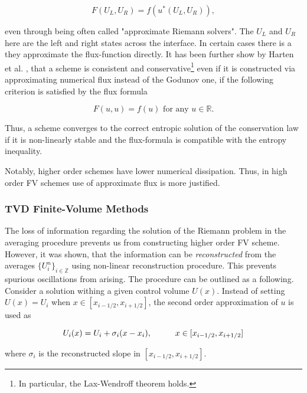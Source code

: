 \begin{equation}
F(U_L, U_R) = f(u^*(U_L, U_R)), 
\end{equation}

even through being often called "approximate Riemann solvers". The $U_L$ and $U_R$ here are the left and right states across the interface. In certain cases there is a they approximate the flux-function directly. It has been further show by Harten et al. \citep{Harten:1983}, that a scheme is consistent and conservative\footnote{
    In particular, the Lax-Wendroff theorem holds.
} even if it is constructed via approximating numerical flux instead of the Godunov one, if the following criterion is satisfied by the flux formula

\begin{equation}
F(u, u) = f(u) \text{ for any } u\in \mathbb{R}.
\end{equation}

Thus, a scheme converges to the correct entropic solution of the conservation law if it is non-linearly stable and the flux-formula is compatible with the entropy inequality. 

Notably, higher order schemes have lower numerical dissipation. Thus, in high order \ac{FV} schemes use of approximate flux is more justified.



\subsubsection{TVD Finite-Volume Methods}

The loss of information regarding the solution of the Riemann problem in the averaging procedure prevents us from constructing higher order \ac{FV} scheme. However, it was shown, that the information can be \textit{reconstructed} from the averages $\{U_i ^n\}_{i\in\mathbb{Z}}$ using non-linear reconstruction procedure. This prevents spurious oscillations from arising. The procedure can be outlined as a following. Consider a solution withing a given control volume $U(x)$. Instead of setting $U(x) = U_i$ when $x\in[x_{i-1/2},x_{i+1/2}]$, the second order approximation of $u$ is used as 

\begin{equation}
U_i(x) = U_i + \sigma_i(x-x_i), \hspace{10mm}x\in[x_{i-1/2},x_{i+1/2}]
\end{equation}

where $\sigma_i$ is the reconstructed slope in $[x_{i-1/2},x_{i+1/2}]$. 

